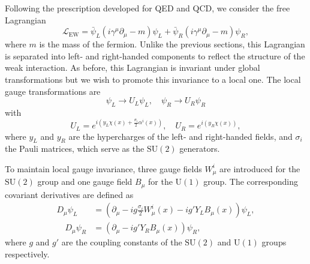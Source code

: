 Following the prescription developed for QED and QCD, we consider the free Lagrangian
\begin{equation}
  \mathcal{L}_{\mathrm{EW}} = \bar{\psi}_{L}(i\gamma^{\mu}\partial_{\mu} - m)\psi_{L} + \bar{\psi}_{R}(i\gamma^{\mu}\partial_{\mu} - m)\psi_{R},
  \label{eq:ew_free_lagrangian}
\end{equation}
where $m$ is the mass of the fermion. Unlike the previous sections, this Lagrangian is separated into left- and right-handed components to reflect the structure of the weak interaction. As before, this Lagrangian is invariant under global transformations but we wish to promote this invariance to a local one. The local gauge transformations are
\begin{equation}
  \psi_{L} \to U_{L}\psi_{L}, \quad
  \psi_{R} \to U_{R}\psi_{R}
  \label{eq:ew_local_symmetry}
\end{equation}
with
\begin{equation}
  U_{L} = e^{i(y_{L}\chi(x) + \frac{\sigma_{i}}{2}\alpha^{i}(x))}, \quad
  U_{R} = e^{i(y_{R}\chi(x))},
  \label{eq:ew_local_transformation}
\end{equation}
where $y_{L}$ and $y_{R}$ are the hypercharges of the left- and right-handed fields, and $\sigma_{i}$ the Pauli matrices, which serve as the $\mathrm{SU}(2)$ generators. 

To maintain local gauge invariance, three gauge fields $W_{\mu}^{i}$ are introduced for the $\mathrm{SU}(2)$ group and one gauge field $B_{\mu}$ for the $\mathrm{U}(1)$ group. The corresponding covariant derivatives are defined as
\begin{align}
  D_{\mu}\psi_{L} &= (\partial_{\mu} - ig\frac{\sigma_{i}}{2}W^{i}_{\mu}(x) - ig'Y_{L}B_{\mu}(x))\psi_{L}, \\ \quad 
  D_{\mu}\psi_{R} &= (\partial_{\mu} - ig'Y_{R}B_{\mu}(x))\psi_{R},
  \label{eq:ew_covariant_derivative} 
\end{align}
where $g$ and $g'$ are the coupling constants of the $\mathrm{SU}(2)$ and $\mathrm{U}(1)$ groups respectively.

